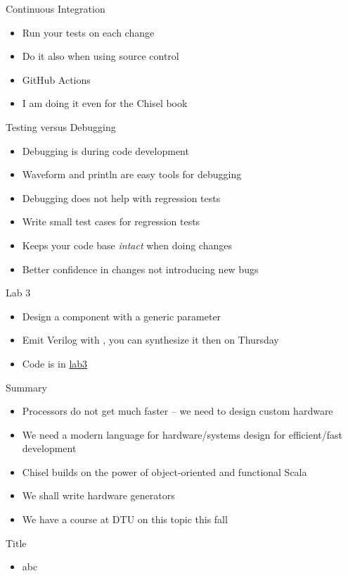 \begin{frame}[fragile]{Continuous Integration}
\begin{itemize}
\item Run your tests on each change
\item Do it also when using source control
\item GitHub Actions
\item I am doing it even for the Chisel book
\end{itemize}
\end{frame}

\begin{frame}[fragile]{Testing versus Debugging}
\begin{itemize}
\item Debugging is during code development
\item Waveform and println are easy tools for debugging
\item Debugging does not help with regression tests
\item Write small test cases for regression tests
\item Keeps your code base \emph{intact} when doing changes
\item Better confidence in changes not introducing new bugs
\end{itemize}
\end{frame}

\begin{frame}[fragile]{Lab 3}
\begin{itemize}
\item Design a component with a generic parameter
\item Emit Verilog with , you can synthesize it then on Thursday
\item Code is in \href{https://github.com/schoeberl/agile-hw/tree/main/lab3}{lab3}
\end{itemize}
\end{frame}

\begin{frame}[fragile]{Summary}
\begin{itemize}
\item Processors do not get much faster -- we need to design custom hardware
\item We need a modern language for hardware/systems design for efficient/fast development
\item Chisel builds on the power of object-oriented and functional Scala
\item We shall write hardware generators
\item We have a course at DTU on this topic this fall
\end{itemize}
\end{frame}




\begin{frame}[fragile]{Title}
\begin{itemize}
\item abc
\end{itemize}
\end{frame}
